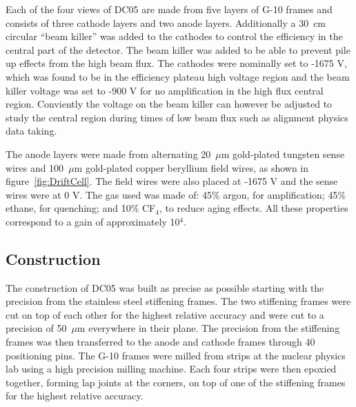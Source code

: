 Each of the four views of DC05 are made from five layers of G-10
frames and consists of three cathode layers and two anode layers.
Additionally a 30~cm circular ``beam killer'' was added to the
cathodes to control the efficiency in the central part of the
detector.  The beam killer was added to be able to prevent pile up effects from
the high beam flux.  The cathodes were nominally set to -1675 V, which
was found to be in the efficiency plateau high voltage region and the
beam killer voltage was set to -900 V for no amplification in the high
flux central region.  Conviently the voltage on the beam killer can
however be adjusted to study the central region during times of low
beam flux such as alignment physics data taking.  \par


The anode layers were made from alternating 20~$\mu$m gold-plated
tungsten sense wires and 100~$\mu$m gold-plated copper beryllium field
wires, as shown in figure~\ref{fig:DriftCell}.  The field wires were
also placed at -1675 V and the sense wires were at 0 V.  The gas used
was made of: 45\% argon, for amplification; 45\% ethane, for
quenching; and 10\% CF$_4$, to reduce aging effects.  All these
properties correspond to a gain of approximately 10$^4$.

\subsection{Construction}
The construction of DC05 was built as precise as possible starting
with the precision from the stainless steel stiffening frames.  The
two stiffening frames were cut on top of each other for the highest
relative accuracy and were cut to a precision of 50~$\mu$m everywhere
in their plane.  The precision from the stiffening frames was then
transferred to the anode and cathode frames through 40 positioning
pins.  The G-10 frames were milled from strips at the nuclear physics
lab using a high precision milling machine.  Each four strips were
then epoxied together, forming lap joints at the corners, on top of
one of the stiffening frames for the highest relative accuracy.  \par

